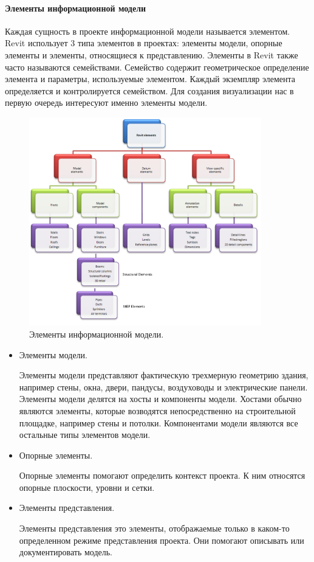 ﻿\paragraph{Элементы информационной модели}

Каждая сущность в проекте информационной модели называется элементом.
Revit использует 3 типа элементов в проектах:
элементы модели, опорные элементы и элементы, относящиеся к представлению.
Элементы в Revit также часто называются семействами.
Семейство содержит геометрическое определение элемента и
параметры, используемые элементом.
Каждый экземпляр элемента определяется и контролируется семейством.%
\cite{DocRevit}
Для создания визуализации нас в первую очередь интересуют
именно элементы модели.

\begin{figure}[!htp]
    \centering
    \includegraphics[width=0.9\textwidth]{images/Revit-elements.png}
    \caption{Элементы информационной модели.%
    \cite{DocRevit}}
    \label{figure:RevitElements}
\end{figure}

\begin{itemize}
    \item {
        Элементы модели.

        Элементы модели представляют фактическую трехмерную геометрию здания,
        например стены, окна, двери, пандусы,
        воздуховоды и электрические панели.
        Элементы модели делятся на хосты и компоненты модели.
        Хостами обычно являются элементы,
        которые возводятся непосредственно на строительной площадке,
        например стены и потолки.
        Компонентами модели являются все остальные типы элементов модели.
    }
    \item {
        Опорные элементы.

        Опорные элементы помогают определить контекст проекта.
        К ним относятся опорные плоскости, уровни и сетки.
    }
    \item {
        Элементы представления.

        Элементы представления это элементы,
        отображаемые только в каком-то определенном режиме представления проекта.
        Они помогают описывать или документировать модель.
    }
\end{itemize}

